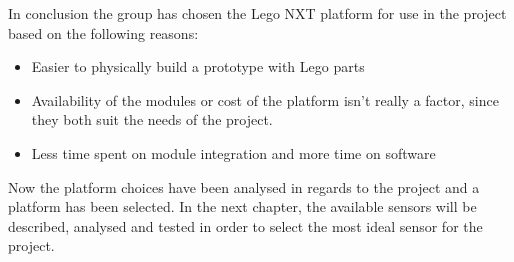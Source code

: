 In conclusion the group has chosen the Lego NXT platform for use in the project
based on the following reasons:
\begin{itemize}
  \item Easier to physically build a prototype with Lego parts
  \item Availability of the modules or cost of the platform isn't really a
  factor, since they both suit the needs of the project.
  \item Less time spent on module integration and more time on software
\end{itemize}

Now the platform choices have been analysed in regards to the project and a
platform has been selected. In the next chapter, the available sensors will be
described, analysed and tested in order to select the most ideal sensor for the
project.
